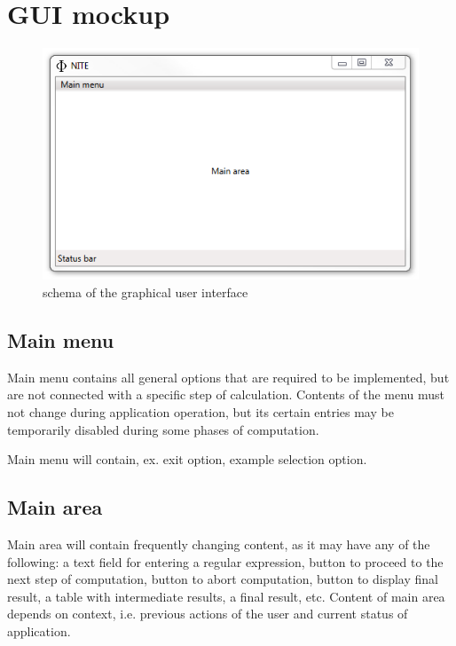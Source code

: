 \documentclass{article}
\begin{document}
\section{GUI mockup}

\begin{figure}[ht!]
  \centering
  \includegraphics[width=.5\textwidth]{../../graphics/PhiniteGuiMockup.png}
  \caption{schema of the graphical user interface}
\end{figure}

\subsection{Main menu}
Main menu contains all general options that are required to be implemented, but are not connected
with a specific step of calculation. Contents of the menu must not change during application
operation, but its certain entries may be temporarily disabled during some phases of computation.

Main menu will contain, ex. exit option, %
example selection option.

\subsection{Main area}
Main area will contain frequently changing content, as it may have any of the following: a text
field for entering a regular expression, button to proceed to the next step of computation, button
to abort computation, button to display final result, a table with intermediate results, a final
result, etc. Content of main area depends on context, i.e. previous actions of the user and current
status of application.
\end{document}
